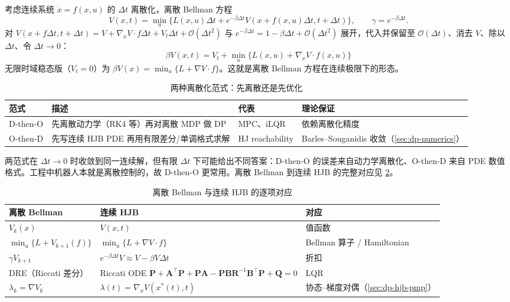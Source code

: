 考虑连续系统 $\dot x=f(x,u)$ 的 $\Delta t$ 离散化，离散 Bellman 方程
\[
V(x,t)=\min_u\big\{L(x,u)\Delta t+e^{-\beta\Delta t}V(x+f(x,u)\Delta t,t+\Delta t)\big\},\qquad \gamma=e^{-\beta\Delta t}.
\]
对 $V(x+f\Delta t,t+\Delta t)=V+\nabla_xV\cdot f\Delta t+V_t\Delta t+\mathcal O(\Delta t^2)$ 与 $e^{-\beta\Delta t}=1-\beta\Delta t+\mathcal O(\Delta t^2)$ 展开，代入并保留至 $\mathcal O(\Delta t)$、消去 $V$、除以 $\Delta t$、令 $\Delta t\to0$：
\begin{equation}
  \boxed{\;\beta V(x,t)=V_t+\min_u\{L(x,u)+\nabla_xV\cdot f(x,u)\}\;}
  \label{eq:dp-discount-hjb}
\end{equation}
无限时域稳态版（$V_t=0$）为 $\beta V(x)=\min_u\{L+\nabla V\cdot f\}$。这就是离散 Bellman 方程在连续极限下的形态。

\begin{table}[H]\centering\small
\caption{两种离散化范式：先离散还是先优化}
\label{tab:dp-DtO-OtD}
\begin{tabular}{llll}
\toprule
范式 & 描述 & 代表 & 理论保证 \\
\midrule
D-then-O & 先离散动力学（RK4 等）再对离散 MDP 做 DP & MPC、iLQR & 依赖离散化精度 \\
O-then-D & 先写连续 HJB PDE 再用有限差分/单调格式求解 & HJ reachability & Barles--Souganidis 收敛（\cref{sec:dp-numerics}） \\
\bottomrule
\end{tabular}
\end{table}

两范式在 $\Delta t\to0$ 时收敛到同一连续解，但有限 $\Delta t$ 下可能给出不同答案：D-then-O 的误差来自动力学离散化、O-then-D 来自 PDE 数值格式。工程中机器人本就是离散控制的，故 D-then-O 更常用。离散 Bellman 到连续 HJB 的完整对应见 \cref{tab:dp-bellman-hjb}。

\begin{table}[H]\centering\small
\caption{离散 Bellman 与连续 HJB 的逐项对应}
\label{tab:dp-bellman-hjb}
\begin{tabular}{lll}
\toprule
离散 Bellman & 连续 HJB & 对应 \\
\midrule
$V_k(x)$ & $V(x,t)$ & 值函数 \\
$\min_u\{L+V_{k+1}(f)\}$ & $\min_u\{L+\nabla V\cdot f\}$ & Bellman 算子 / Hamiltonian \\
$\gamma V_{k+1}$ & $e^{-\beta\Delta t}V\approx V-\beta V\Delta t$ & 折扣 \\
DRE（Riccati 差分） & Riccati ODE $\dot{\mathbf P}+\mathbf A^\top\mathbf P+\mathbf P\mathbf A-\mathbf P\mathbf B\mathbf R^{-1}\mathbf B^\top\mathbf P+\mathbf Q=0$ & LQR \\
$\lambda_k=\nabla V_k$ & $\lambda(t)=\nabla_xV(x^*(t),t)$ & 协态--梯度对偶（\cref{sec:dp-hjb-pmp}） \\
\bottomrule
\end{tabular}
\end{table}


